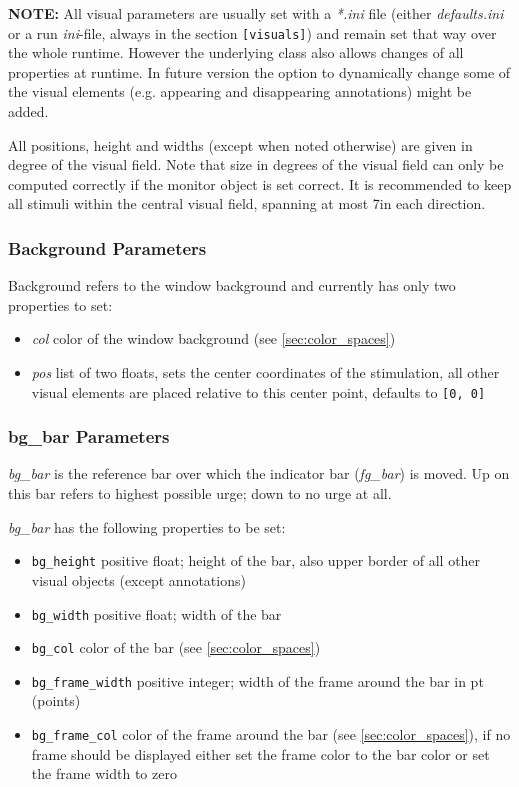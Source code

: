 \documentclass[12pt,a4paper]{book}
\begin{document}
\textbf{NOTE:} All visual parameters are usually set with a \emph{*.ini} file (either \textit{defaults.ini} or a run \textit{ini}-file, always in the section \verb|[visuals]|) and remain set that way over the whole runtime. However the underlying class also allows changes of all properties at runtime. In future version the option to dynamically change some of the visual elements (e.g. appearing and disappearing annotations) might be added.

All positions, height and widths (except when noted otherwise) are given in degree of the visual field. Note that size in degrees of the visual field can only be computed correctly if the monitor object is set correct. It is recommended to keep all stimuli within the central visual field, spanning at most 7\degree  in each direction.

\subsubsection{Background Parameters}

Background refers to the window background and currently has only two properties to set:
\begin{itemize}
\item \textit{col} color of the window background (see \ref{sec:color_spaces})
\item \textit{pos} list of two floats, sets the center coordinates of the stimulation, all other visual elements are placed relative to this center point, defaults to \verb|[0, 0]|
\end{itemize}

\subsubsection{bg\_bar Parameters}

\textit{bg\_bar} is the reference bar over which the indicator bar (\textit{fg\_bar}) is moved. Up on this bar refers to highest possible urge; down to no urge at all.

\textit{bg\_bar} has the following properties to be set:
\begin{itemize}
\item \verb|bg_height| positive float; height of the bar, also upper border of all other visual objects (except annotations)
\item \verb|bg_width| positive float; width of the bar
\item \verb|bg_col| color of the bar (see \ref{sec:color_spaces})
\item \verb|bg_frame_width| positive integer; width of the frame around the bar in pt (points)
\item \verb|bg_frame_col| color of the frame around the bar (see \ref{sec:color_spaces}), if no frame should be displayed either set the frame color to the bar color or set the frame width to zero
\end{itemize}
\end{document}
